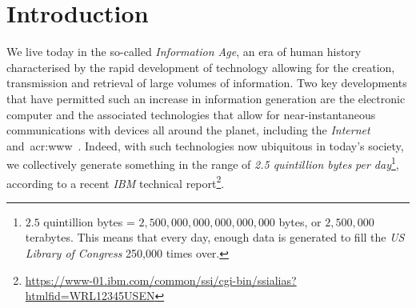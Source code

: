 
\chapter{Introduction}\label{chap:intro}
We live today in the so-called \emph{Information Age}, an era of human history characterised by the rapid development of technology allowing for the creation, transmission and retrieval of large volumes of information. Two key developments that have permitted such an increase in information generation are the electronic computer and the associated technologies that allow for near-instantaneous communications with devices all around the planet, including the \emph{Internet} and~\gls{acr:www}~\citep{berners1994www}. Indeed, with such technologies now ubiquitous in today's society, we collectively generate something in the range of \emph{2.5 quintillion bytes} \emph{per day}\footnote{$2.5$ quintillion bytes = $2,500,000,000,000,000,000$ bytes, or $2,500,000$ terabytes. This means that every day, enough data is generated to fill the \emph{US Library of Congress} 250,000 times over.}, according to a recent \emph{IBM} technical report\footnote{\url{https://www-01.ibm.com/common/ssi/cgi-bin/ssialias?htmlfid=WRL12345USEN}}.


\begin{figure}[h]
    \centering
    \vspace{5mm}
    \label{fig:stopsign}
    \vspace{-4mm}
\end{figure}


